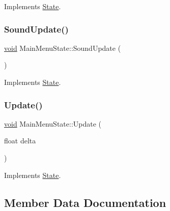 Implements \hyperlink{classState_a0e48dfae1e3090630475812681417c5f}{State}.

\mbox{\label{classMainMenuState_adde4b3b16d68c2c8b3bd03818cc30abe}} 
\subsubsection{\texorpdfstring{Sound\+Update()}{SoundUpdate()}}
{\footnotesize\ttfamily \hyperlink{imgui__impl__opengl3__loader_8h_ac668e7cffd9e2e9cfee428b9b2f34fa7}{void} Main\+Menu\+State\+::\+Sound\+Update (\begin{DoxyParamCaption}{ }\end{DoxyParamCaption})\hspace{0.3cm}{\ttfamily [virtual]}}



Implements \hyperlink{classState_a6572089fbf2178bf5c582cc27d6d3925}{State}.

\mbox{\label{classMainMenuState_a1605be0d2e5228643d911c7069db3196}} 
\subsubsection{\texorpdfstring{Update()}{Update()}}
{\footnotesize\ttfamily \hyperlink{imgui__impl__opengl3__loader_8h_ac668e7cffd9e2e9cfee428b9b2f34fa7}{void} Main\+Menu\+State\+::\+Update (\begin{DoxyParamCaption}\item[{float}]{delta }\end{DoxyParamCaption})\hspace{0.3cm}{\ttfamily [virtual]}}



Implements \hyperlink{classState_aac0d3fdee1341e168af730b8f31a7bf1}{State}.



\subsection{Member Data Documentation}
\mbox{\label{classMainMenuState_ac9a8bee0cca101412d442a82b71fc51a}} 
